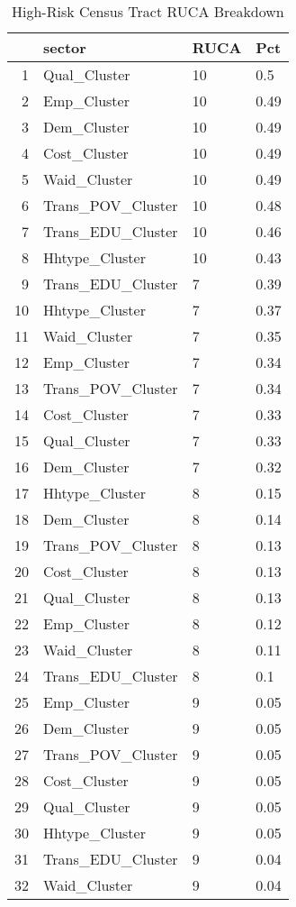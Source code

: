 \begin{table}[ht]
    \caption{High-Risk Census Tract RUCA Breakdown}
    \label{tab:ruca_risk}
    \small
    \centering
    \begin{tabular}{rlll}
        \hline
       & sector & RUCA & Pct \\ 
        \hline
      1 & Qual\_Cluster & 10 & 0.5 \\ 
        2 & Emp\_Cluster & 10 & 0.49 \\ 
        3 & Dem\_Cluster & 10 & 0.49 \\ 
        4 & Cost\_Cluster & 10 & 0.49 \\ 
        5 & Waid\_Cluster & 10 & 0.49 \\ 
        6 & Trans\_POV\_Cluster & 10 & 0.48 \\ 
        7 & Trans\_EDU\_Cluster & 10 & 0.46 \\ 
        8 & Hhtype\_Cluster & 10 & 0.43 \\ 
        9 & Trans\_EDU\_Cluster & 7 & 0.39 \\ 
        10 & Hhtype\_Cluster & 7 & 0.37 \\ 
        11 & Waid\_Cluster & 7 & 0.35 \\ 
        12 & Emp\_Cluster & 7 & 0.34 \\ 
        13 & Trans\_POV\_Cluster & 7 & 0.34 \\ 
        14 & Cost\_Cluster & 7 & 0.33 \\ 
        15 & Qual\_Cluster & 7 & 0.33 \\ 
        16 & Dem\_Cluster & 7 & 0.32 \\ 
        17 & Hhtype\_Cluster & 8 & 0.15 \\ 
        18 & Dem\_Cluster & 8 & 0.14 \\ 
        19 & Trans\_POV\_Cluster & 8 & 0.13 \\ 
        20 & Cost\_Cluster & 8 & 0.13 \\ 
        21 & Qual\_Cluster & 8 & 0.13 \\ 
        22 & Emp\_Cluster & 8 & 0.12 \\ 
        23 & Waid\_Cluster & 8 & 0.11 \\ 
        24 & Trans\_EDU\_Cluster & 8 & 0.1 \\ 
        25 & Emp\_Cluster & 9 & 0.05 \\ 
        26 & Dem\_Cluster & 9 & 0.05 \\ 
        27 & Trans\_POV\_Cluster & 9 & 0.05 \\ 
        28 & Cost\_Cluster & 9 & 0.05 \\ 
        29 & Qual\_Cluster & 9 & 0.05 \\ 
        30 & Hhtype\_Cluster & 9 & 0.05 \\ 
        31 & Trans\_EDU\_Cluster & 9 & 0.04 \\ 
        32 & Waid\_Cluster & 9 & 0.04 \\ 
         \hline
      \end{tabular}
      \end{table}